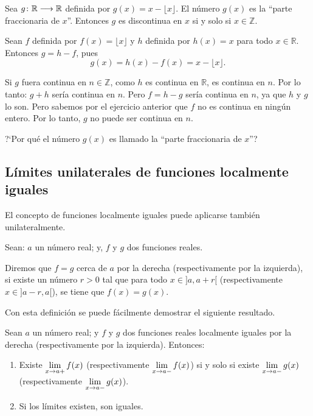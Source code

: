 \begin{exemplo}[Solución]{%
Sea $\funcjc{g}{\mathbb{R}}{\mathbb{R}}$ definida por $g(x)=x-\lfloor x \rfloor$. El número $g(x)$
es la ``parte fraccionaria de $x$''. Entonces $g$ es discontinua en $x$ si y solo si $x\in
\mathbb{Z}$.}

Sean $f$ definida por $f(x) = \lfloor x\rfloor$ y $h$ definida por $h(x) = x$ para todo
$x\in\mathbb{R}$. Entonces $g = h - f$, pues
\[
g(x) = h(x) - f(x) = x - \lfloor x \rfloor.
\]

Si $g$ fuera continua en $n\in\mathbb{Z}$, como $h$ es continua en $\mathbb{R}$, es continua en
$n$. Por lo tanto: $g + h$ sería continua en $n$. Pero $f = h - g$ sería continua en $n$, ya que
$h$ y $g$ lo son. Pero sabemos por el ejercicio anterior que $f$ no es continua en ningún entero.
Por lo tanto, $g$ no puede ser continua en $n$.

?`Por qué el número $g(x)$ es llamado la ``parte fraccionaria de $x$''?
\end{exemplo}

\subsection{Límites unilaterales de funciones localmente iguales}

El concepto de funciones localmente iguales puede aplicarse también unilateralmente.

\begin{defical}
Sean: $a$ un número real; y, $f$ y $g$ dos funciones reales.

Diremos que $f=g$ cerca de $a$ por la derecha (respectivamente por la izquierda), si existe un número $r>0$ tal que para todo $x\in ]a,a+r[$ (respectivamente $x\in ]a-r,a[$), se tiene que $f(x)=g(x)$.
\end{defical}

Con esta definición se puede fácilmente demostrar el siguiente resultado.

\begin{teocal}%
Sean $a$ un número real; y $f$ y $g$ dos funciones reales localmente iguales por la derecha (respectivamente por la izquierda). Entonces:
\begin{enumerate}
\item Existe $\displaystyle\limjc{f(x)}{x}{a{+}}$ (respectivamente $\displaystyle\limjc{f(x)}{x}{a{-}}$) si y solo si existe $\displaystyle\limjc{g(x)}{x}{a{-}}$ (respectivamente $\displaystyle\limjc{g(x)}{x}{a{-}}$).
\item Si los límites existen, son iguales.
\end{enumerate}
\end{teocal}


